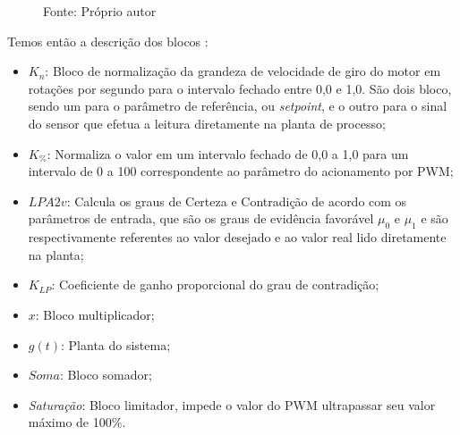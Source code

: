 \begin{figure}[!h]
\label{fig:diagramaBlocosLPA2v}

{\vspace{0.2cm} \small Fonte: Próprio autor}
\end{figure}

Temos então a descrição dos blocos :

\begin{itemize}
  \item $K_n$: Bloco de normalização da grandeza de velocidade de giro do motor em rotações por segundo para o intervalo fechado entre 0,0 e 1,0. 
São dois bloco, sendo um para o parâmetro de referência, 
ou \emph{setpoint}, e o outro para o sinal do sensor que efetua a 
leitura diretamente na planta de processo;

  \item $K_{\%}$: Normaliza o valor em um intervalo fechado de 0,0 a 1,0 para um intervalo de 0 a 100 correspondente ao parâmetro do acionamento por PWM;

  \item $LPA2v$: Calcula os graus de Certeza e Contradição 
de acordo com os parâmetros de entrada, 
que são os graus de evidência favorável $\mu _0$ e $\mu _1$ e são
respectivamente referentes ao valor desejado e 
ao valor real lido diretamente na planta;

  \item $K_{LP}$: Coeficiente de ganho proporcional do grau de contradição;

  \item $x$: Bloco multiplicador;

  \item $g(t)$: Planta do sistema;

  \item $Soma$: Bloco somador;

  \item \emph{Saturação}: Bloco limitador, impede o valor do PWM ultrapassar seu valor máximo de 100\%. 
\end{itemize}




